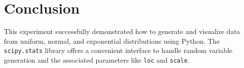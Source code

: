\documentclass[12pt]{article}
\begin{document}
\FloatBarrier  %

\section*{Conclusion}
This experiment successfully demonstrated how to generate and visualize data from uniform, normal, and exponential distributions using Python. The \texttt{scipy.stats} library offers a convenient interface to handle random variable generation and the associated parameters like \texttt{loc} and \texttt{scale}.
\end{document}
